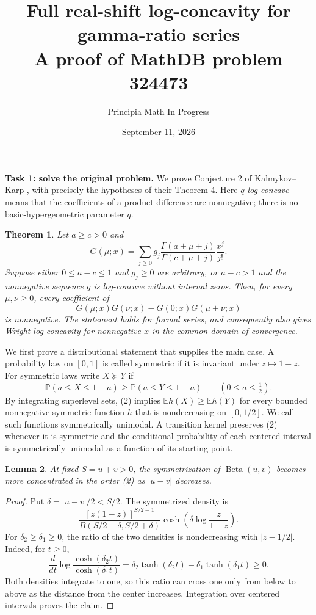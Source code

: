 \documentclass[10pt]{article}
\title{Full real-shift log-concavity for gamma-ratio series\\
\large A proof of MathDB problem 324473}
\author{Principia Math In Progress}
\date{September 11, 2026}
\newtheorem{theorem}{Theorem}
\newtheorem{lemma}[theorem]{Lemma}
\newcommand{\E}{\mathbb E}
\newcommand{\PP}{\mathbb P}
\newcommand{\Be}{\operatorname{Beta}}
\begin{document}
\maketitle

\noindent\textbf{Task 1: solve the original problem.}
We prove Conjecture 2 of Kalmykov--Karp \cite[p.~413]{KK},
with precisely the hypotheses of their Theorem 4. Here \emph{\(q\)-log-concave}
means that the coefficients of a product difference are nonnegative;
there is no basic-hypergeometric parameter \(q\).

\begin{theorem}\label{thm:main}
Let \(a\ge c>0\) and
\[
 G(\mu;x)=\sum_{j\ge0}g_j\frac{\Gamma(a+\mu+j)}{\Gamma(c+\mu+j)}
                    \frac{x^j}{j!}.
\]
Suppose either \(0\le a-c\le1\) and \(g_j\ge0\) are arbitrary, or
\(a-c>1\) and the nonnegative sequence \(g\) is log-concave without
internal zeros. Then, for every \(\mu,\nu\ge0\), every coefficient of
\[
 G(\mu;x)G(\nu;x)-G(0;x)G(\mu+\nu;x)
 \tag{1}
\]
is nonnegative. The statement holds for formal series, and consequently
also gives Wright log-concavity for nonnegative \(x\) in the common
domain of convergence.
\end{theorem}

We first prove a distributional statement that supplies the main case.
A probability law on \([0,1]\) is called symmetric if it is invariant under
\(z\mapsto1-z\). For symmetric laws write \(X\succeq Y\) if
\[
 \PP(a\le X\le1-a)\ge \PP(a\le Y\le1-a)\qquad(0\le a\le\tfrac12).
 \tag{2}
\]
By integrating superlevel sets, (2) implies
\(\E h(X)\ge\E h(Y)\) for every bounded nonnegative symmetric function
\(h\) that is nondecreasing on \([0,1/2]\). We call such functions
symmetrically unimodal. A transition kernel preserves (2) whenever it is
symmetric and the conditional probability of each centered interval is
symmetrically unimodal as a function of its starting point.

\begin{lemma}\label{lem:beta}
At fixed \(S=u+v>0\), the symmetrization of \(\Be(u,v)\) becomes more
concentrated in the order (2) as \(|u-v|\) decreases.
\end{lemma}
\begin{proof}
Put \(\delta=|u-v|/2<S/2\). The symmetrized density is
\[
 \frac{[z(1-z)]^{S/2-1}}{B(S/2-\delta,S/2+\delta)}
 \cosh\!\left(\delta\log\frac z{1-z}\right).
 \tag{3}
\]
For \(\delta_2\ge\delta_1\ge0\), the ratio of the two densities is
nondecreasing with \(|z-1/2|\). Indeed, for \(t\ge0\),
\[
 \frac{d}{dt}\log\frac{\cosh(\delta_2t)}{\cosh(\delta_1t)}
 =\delta_2\tanh(\delta_2t)-\delta_1\tanh(\delta_1t)\ge0.
\]
Both densities integrate to one, so this ratio can cross one only from
below to above as the distance from the center increases. Integration
over centered intervals proves the claim.
\end{proof}
\end{document}
